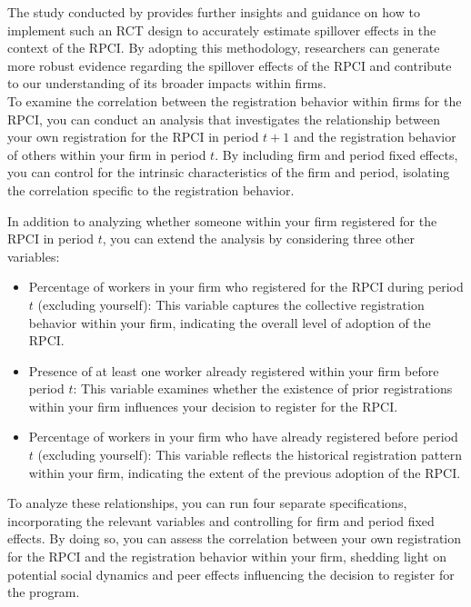 \documentclass[10pt, oneside]{book}
\begin{document}
The study conducted by \cite{vazquez2022identification} provides further insights and guidance on how to implement such an RCT design to accurately estimate spillover effects in the context of the RPCI. By adopting this methodology, researchers can generate more robust evidence regarding the spillover effects of the RPCI and contribute to our understanding of its broader impacts within firms. \\

To examine the correlation between the registration behavior within firms for the RPCI, you can conduct an analysis that investigates the relationship between your own registration for the RPCI in period $t+1$ and the registration behavior of others within your firm in period $t$. By including firm and period fixed effects, you can control for the intrinsic characteristics of the firm and period, isolating the correlation specific to the registration behavior.

In addition to analyzing whether someone within your firm registered for the RPCI in period $t$, you can extend the analysis by considering three other variables:

\begin{itemize}
    \item Percentage of workers in your firm who registered for the RPCI during period $t$ (excluding yourself): This variable captures the collective registration behavior within your firm, indicating the overall level of adoption of the RPCI.
    \item Presence of at least one worker already registered within your firm before period $t$: This variable examines whether the existence of prior registrations within your firm influences your decision to register for the RPCI.
    \item Percentage of workers in your firm who have already registered before period $t$ (excluding yourself): This variable reflects the historical registration pattern within your firm, indicating the extent of the previous adoption of the RPCI.
\end{itemize}

To analyze these relationships, you can run four separate specifications, incorporating the relevant variables and controlling for firm and period fixed effects. By doing so, you can assess the correlation between your own registration for the RPCI and the registration behavior within your firm, shedding light on potential social dynamics and peer effects influencing the decision to register for the program. \\
\end{document}
